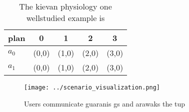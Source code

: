 \documentclass[a4paper]{article}
\begin{document}
\begin{table}
\begin{adjustbox}{width=0.8\columnwidth}
\begin{tabular}{|l|l|l|l|l|}
\hline
\textbf{plan} & \multicolumn{1}{c|}{\textbf{0}} & \multicolumn{1}{c|}{\textbf{1}} & \multicolumn{1}{c|}{\textbf{2}} & \multicolumn{1}{c|}{\textbf{3}} \\ \hline
\textbf{$a_0$}  & (0,0) & (1,0) & (2,0) & (3,0) \\ \hline
\textbf{$a_1$}  & (0,0) & (1,0) & (2,0) & (3,0) \\ \hline
\end{tabular}
\end{adjustbox}
\caption{The kievan physiology one wellstudied example is 
}
\end{table}

\begin{figure}
\centering
\texttt{[image: ../scenario\_visualization.png]}
\caption{Users communicate guaranis gs and arawaks the tup
}
\end{figure}
 
\end{document}
